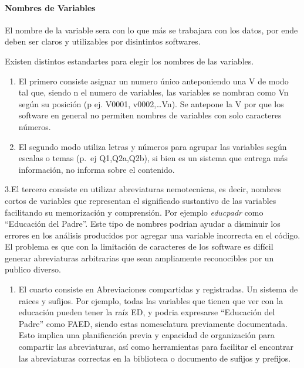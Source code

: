 \documentclass[
  14pt,
]{book}
\providecommand{\tightlist}{%
  \setlength{\itemsep}{0pt}\setlength{\parskip}{0pt}}
\begin{document}
\hypertarget{nombres-de-variables}{%
\paragraph{Nombres de Variables}\label{nombres-de-variables}}

El nombre de la variable sera con lo que más se trabajara con los datos, por ende deben ser claros y utilizables por disintintos softwares.

Existen distintos estandartes para elegir los nombres de las variables.

\begin{enumerate}
\def\labelenumi{\arabic{enumi}.}
\item
  El primero consiste asignar un numero único anteponiendo una V de modo tal que, siendo n el numero de variables, las variables se nombran como Vn según su posición (p ej. V0001, v0002,\ldots Vn). Se antepone la V por que los software en general no permiten nombres de variables con solo caracteres números.
\item
  El segundo modo utiliza letras y números para agrupar las variables según escalas o temas (p.~ej Q1,Q2a,Q2b), si bien es un sistema que entrega más información, no informa sobre el contenido.
\end{enumerate}

3.El tercero consiste en utilizar abreviaturas nemotecnicas, es decir, nombres cortos de variables que representan el significado sustantivo de las variables facilitando su memorización y comprensión. Por ejemplo \emph{educpadr} como ``Educación del Padre''. Este tipo de nombres podrian ayudar a disminuir los errores en los análisis producidos por agregar una variable incorrecta en el código. El problema es que con la limitación de caracteres de los software es difícil generar abreviaturas arbitrarias que sean ampliamente reconocibles por un publico diverso.

\begin{enumerate}
\def\labelenumi{\arabic{enumi}.}
\setcounter{enumi}{3}
\tightlist
\item
  El cuarto consiste en Abreviaciones compartidas y registradas. Un sistema de raices y sufijos. Por ejemplo, todas las variables que tienen que ver con la educación pueden tener la raíz ED, y podria expresarse ``Educación del Padre'' como FAED, siendo estas nomesclatura previamente documentada. Esto implica una planificación previa y capacidad de organización para compartir las abreviaturas, así como herramientas para facilitar el encontrar las abreviaturas correctas en la biblioteca o documento de sufijos y prefijos.
\end{enumerate}
\end{document}
